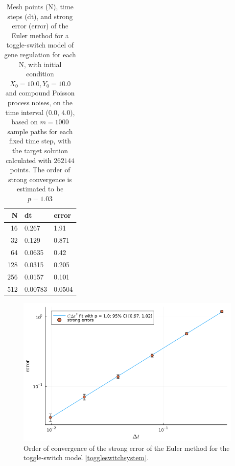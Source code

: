 \documentclass[reqno,12pt]{amsart}
\theoremstyle{plain} %
\theoremstyle{definition} %
\begin{document}
\begin{table}
    \begin{tabular}[htb]{|r|l|l|}
        \hline N & dt & error\\
        \hline \hline
        16 & 0.267 & 1.91 \\
        32 & 0.129 & 0.871 \\
        64 & 0.0635 & 0.42 \\
        128 & 0.0315 & 0.205 \\
        256 & 0.0157 & 0.101 \\
        512 & 0.00783 & 0.0504 \\
        \hline
    \end{tabular}
    \bigskip

    \caption{Mesh points (N), time steps (dt), and strong error (error) of the Euler method for a toggle-switch model of gene regulation for each N, with initial condition $X_0 = 10.0, Y_0 = 10.0$ and compound Poisson process noises, on the time interval (0.0, 4.0), based on $m = 1000$ sample paths for each fixed time step, with the target solution calculated with $262144$ points. The order of strong convergence is estimated to be $p = 1.03$}
    \label{tabletoggleswitch}
\end{table}

\begin{figure}[htb]
    \includegraphics[scale=0.6]{img/order_toggleswitch.png}
    \caption{Order of convergence of the strong error of the Euler method for the toggle-switch model \eqref{toggleswitchsystem}.}
    \label{figtoggleswitch}
\end{figure}
\end{document}
